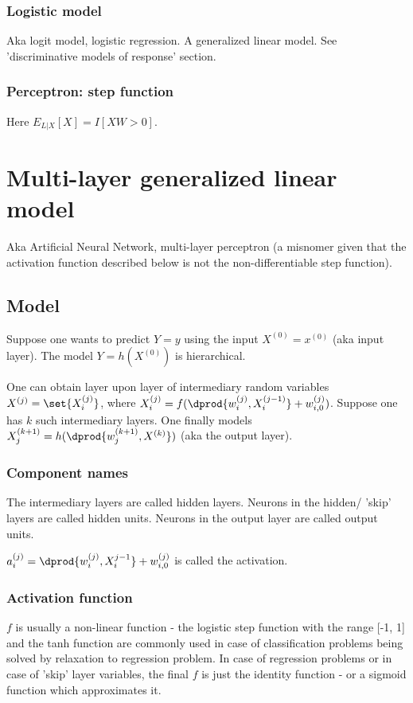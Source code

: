 \documentclass[oneside, article]{memoir}
\begin{document}
\subsubsection{Logistic model}
Aka logit model, logistic regression. A generalized linear model. See 'discriminative models of response' section.

\subsubsection{Perceptron: step function}
Here $E_{L|X}[X] = I[XW > 0]$.

\section{Multi-layer generalized linear model}
Aka Artificial Neural Network, multi-layer perceptron (a misnomer given that the activation function described below is not the non-differentiable step function). 

\subsection{Model}
Suppose one wants to predict $Y=y$ using the input $X^{(0)}=x^{(0)}$ (aka input layer). The model $Y = h(X^{(0)})$ is hierarchical.

One can obtain layer upon layer of intermediary random variables $X^{(j)} = \set{X_i^{(j)}}$, where $X_i^{(j)} = f(\dprod{w_i^{(j)}, X_i^{(j-1)}} + w_{i, 0}^{(j)})$. Suppose one has $k$ such intermediary layers. One finally models $X_j^{(k+1)} = h(\dprod{w_j^{(k+1)}, X^{(k)}})$ (aka the output layer).

\subsubsection{Component names}
The intermediary layers are called hidden layers. Neurons in the hidden/ 'skip' layers are called hidden units. Neurons in the output layer are called output units.

$a_i^{(j)} = \dprod{w_i^{(j)}, X_i^{j-1}} + w_{i, 0}^{(j)}$ is called the activation.

\subsubsection{Activation function}
$f$ is usually a non-linear function - the logistic step function with the range [-1, 1] and the tanh function are commonly used in case of classification problems being solved by relaxation to regression problem. In case of regression problems or in case of 'skip' layer variables, the final $f$ is just the identity function - or a sigmoid function which approximates it. 
\end{document}

